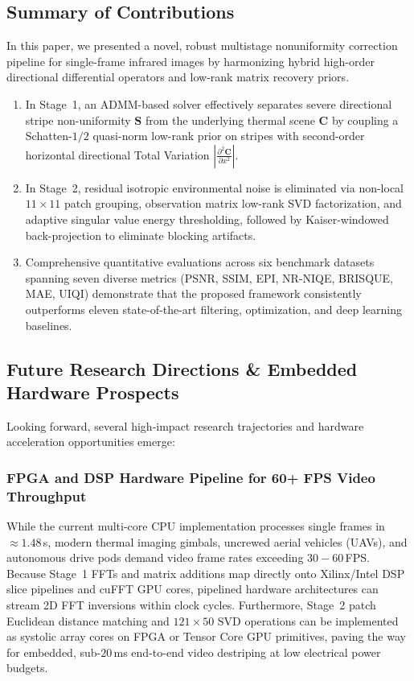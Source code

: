 \subsection{Summary of Contributions}
In this paper, we presented a novel, robust multistage nonuniformity correction pipeline for single-frame infrared images by harmonizing hybrid high-order directional differential operators and low-rank matrix recovery priors. 
\begin{enumerate}
    \item In Stage~1, an ADMM-based solver effectively separates severe directional stripe non-uniformity $\mathbf{S}$ from the underlying thermal scene $\mathbf{C}$ by coupling a Schatten-$1/2$ quasi-norm low-rank prior on stripes with second-order horizontal directional Total Variation $\left|\frac{\partial^2 \mathbf{C}}{\partial x^2}\right|$.
    \item In Stage~2, residual isotropic environmental noise is eliminated via non-local $11 \times 11$ patch grouping, observation matrix low-rank SVD factorization, and adaptive singular value energy thresholding, followed by Kaiser-windowed back-projection to eliminate blocking artifacts.
    \item Comprehensive quantitative evaluations across six benchmark datasets spanning seven diverse metrics (PSNR, SSIM, EPI, NR-NIQE, BRISQUE, MAE, UIQI) demonstrate that the proposed framework consistently outperforms eleven state-of-the-art filtering, optimization, and deep learning baselines.
\end{enumerate}

\subsection{Future Research Directions & Embedded Hardware Prospects}
Looking forward, several high-impact research trajectories and hardware acceleration opportunities emerge:

\subsubsection{FPGA and DSP Hardware Pipeline for 60+ FPS Video Throughput}
While the current multi-core CPU implementation processes single frames in $\approx 1.48$\,s, modern thermal imaging gimbals, uncrewed aerial vehicles (UAVs), and autonomous drive pods demand video frame rates exceeding $30-60$\,FPS. Because Stage~1 FFTs and matrix additions map directly onto Xilinx/Intel DSP slice pipelines and cuFFT GPU cores, pipelined hardware architectures can stream 2D FFT inversions within clock cycles. Furthermore, Stage~2 patch Euclidean distance matching and $121 \times 50$ SVD operations can be implemented as systolic array cores on FPGA or Tensor Core GPU primitives, paving the way for embedded, sub-$20$\,ms end-to-end video destriping at low electrical power budgets.

